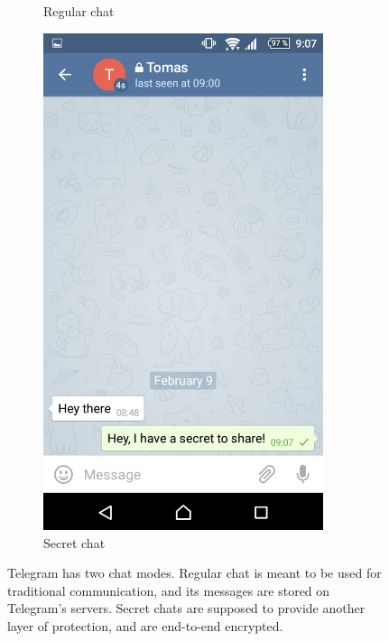 \documentclass[thesis=M,english]{FITthesis}[2012/10/20]
\begin{document}
\begin{figure}[htb]
\begin{subfigure}[b]{0.4\textwidth}
		\caption{Regular chat}
		\label{img:telegram:regular}
	\end{subfigure}
	\hfill
	\begin{subfigure}[b]{0.4\textwidth}
		\centering
		\includegraphics[width=0.9\textwidth]{telegram-secret.png}
		\caption{Secret chat}
		\label{img:telegram:secret}
	\end{subfigure}
	\caption[Telegram chat modes]{Telegram has two chat modes. Regular chat is meant to be used for traditional communication, and its messages are stored on Telegram's servers. Secret chats are supposed to provide another layer of protection, and are end-to-end encrypted.}
\end{figure}
\end{document}
